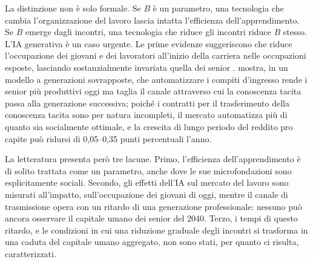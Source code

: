 \documentclass[preprint,12pt,authoryear]{elsarticle}
\begin{document}
La distinzione non è solo formale. Se $B$ è un parametro, una tecnologia che cambia l'organizzazione del lavoro lascia intatta l'efficienza dell'apprendimento. Se $B$ emerge dagli incontri, una tecnologia che riduce gli incontri riduce $B$ stesso. L'IA generativa è un caso urgente. Le prime evidenze suggeriscono che riduce l'occupazione dei giovani e dei lavoratori all'inizio della carriera nelle occupazioni esposte, lasciando sostanzialmente invariata quella dei senior \citep{Brynjolfsson2025,HosseiniLichtinger2025}. \citet{Ide2026} mostra, in un modello a generazioni sovrapposte, che automatizzare i compiti d'ingresso rende i senior più produttivi oggi ma taglia il canale attraverso cui la conoscenza tacita passa alla generazione successiva; poiché i contratti per il trasferimento della conoscenza tacita sono per natura incompleti, il mercato automatizza più di quanto sia socialmente ottimale, e la crescita di lungo periodo del reddito pro capite può ridursi di 0,05--0,35 punti percentuali l'anno.

La letteratura presenta però tre lacune. Primo, l'efficienza dell'apprendimento è di solito trattata come un parametro, anche dove le sue microfondazioni sono esplicitamente sociali. Secondo, gli effetti dell'IA sul mercato del lavoro sono misurati all'impatto, sull'occupazione dei giovani di oggi, mentre il canale di trasmissione opera con un ritardo di una generazione professionale: nessuno può ancora osservare il capitale umano dei senior del 2040. Terzo, i tempi di questo ritardo, e le condizioni in cui una riduzione graduale degli incontri si trasforma in una caduta del capitale umano aggregato, non sono stati, per quanto ci risulta, caratterizzati.
\end{document}
